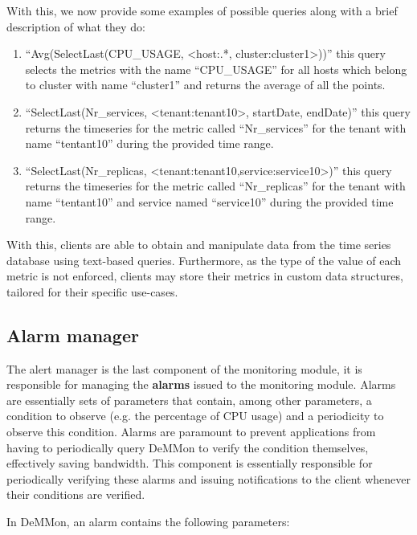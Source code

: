  With this, we now provide some examples of possible queries along with a brief description of what they do:

\begin{enumerate}
    \item ``Avg(SelectLast(CPU\_USAGE, <host:.*, cluster:cluster1>))'' this query selects the metrics with the name ``CPU\_USAGE'' for all hosts which belong to cluster with name ``cluster1'' and returns the average of all the points.
    
    \item ``SelectLast(Nr\_services, <tenant:tenant10>, startDate, endDate)'' this query returns the timeseries for the metric called ``Nr\_services'' for the tenant with name ``tentant10'' during the provided time range.

    \item ``SelectLast(Nr\_replicas, <tenant:tenant10,service:service10>)'' this query returns the timeseries for the metric called ``Nr\_replicas'' for the tenant with name ``tentant10'' and service named ``service10'' during the provided time range.
    
\end{enumerate}

With this, clients are able to obtain and manipulate data from the time series database using text-based queries. Furthermore, as the type of the value of each metric is not enforced, clients may store their metrics in custom data structures, tailored for their specific use-cases.

\subsection{Alarm manager} \label{sec:mon_module:alarm_monitor}

The alert manager is the last component of the monitoring module, it is responsible for managing the \textbf{alarms} issued to the monitoring module. Alarms are essentially sets of parameters that contain, among other parameters, a condition to observe (e.g. the percentage of CPU usage) and a periodicity to observe this condition. Alarms are paramount to prevent applications from having to periodically query DeMMon to verify the condition themselves, effectively saving bandwidth. This component is essentially responsible for periodically verifying these alarms and issuing notifications to the client whenever their conditions are verified. 

In DeMMon, an alarm contains the following parameters: 

